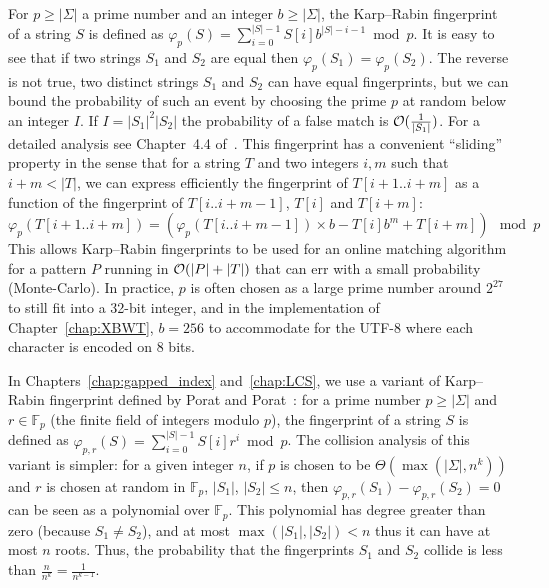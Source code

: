 For $p \geq |\Sigma|$ a prime number and an integer $b\geq |\Sigma|$, the Karp--Rabin fingerprint~\cite{KRfingerprint} of a string $S$ is defined as
$\varphi_{p}(S) = \sum_{i = 0}^{|S|-1}  S[i]b^{|S|-i-1} \bmod p$.
It is easy to see that if two strings $S_1$ and $S_2$ are equal then $\varphi_p(S_1) = \varphi_p(S_2)$. The reverse is not true, two distinct strings $S_1$ and $S_2$ can have equal fingerprints, but we can bound the probability of such an event by choosing the prime $p$ at random below an integer $I$. If $I=|S_1|^2|S_2|$ the probability of a false match is $\mathcal{O}(\frac{1}{|S_1|})$. For a detailed analysis see Chapter~4.4 of~\cite{Gusfield1997}.
This fingerprint has a convenient ``sliding'' property in the sense that for a string $T$ and two integers $i,m$ such that $i+m < |T|$, we can express efficiently the fingerprint of $T[i+1..i+m]$ as a function of the fingerprint of $T[i..i+m-1]$, $T[i]$ and $T[i+m]$:
$$ \varphi_{p}(T[i+1..i+m]) = ( \varphi_{p}(T[i..i+m-1])\times b - T[i]b^{m} + T[i+m]  ) \mod p$$
This allows Karp--Rabin fingerprints to be used for an online matching algorithm for a pattern $P$ running in $\mathcal{O}(|P|+|T|)$ that can err with a small probability (Monte-Carlo).
In practice, $p$ is often chosen as a large prime number around $2^{27}$ to still fit into a 32-bit integer, and in the implementation of Chapter~\ref{chap:XBWT}, $b=256$ to accommodate for the UTF-8 where each character is encoded on 8 bits.

In Chapters~\ref{chap:gapped_index} and~\ref{chap:LCS}, we use a variant of Karp--Rabin fingerprint defined by Porat and Porat~\cite{Porat:09}: 
for a prime number $p\geq |\Sigma|$  and $r \in \mathbb{F}_p$ (the finite field of integers modulo $p$), the fingerprint of a string $S$ is defined as
$\varphi_{p,r}(S) = \sum_{i = 0}^{|S|-1}  S[i]r^{i} \bmod p$.
The collision analysis of this variant is simpler: %
for a given integer $n$, if $p$ is chosen to be $\Theta(\max(|\Sigma|,n^k))$ and $r$ is chosen at random in $\mathbb{F}_p$, $|S_1|$, $|S_2|\leq n$, then $\varphi_{p,r}(S_1) - \varphi_{p,r}(S_2) = 0$ can be seen as a polynomial over $\mathbb{F}_p$. This polynomial has degree greater than zero (because $S_1 \neq S_2$), and at most $\max(|S_1|,|S_2|) < n$ thus it can have at most $n$ roots. Thus, the probability that the fingerprints $S_1$ and $S_2$ collide is less than $\frac{n}{n^k} = \frac{1}{n^{k-1}}$.


